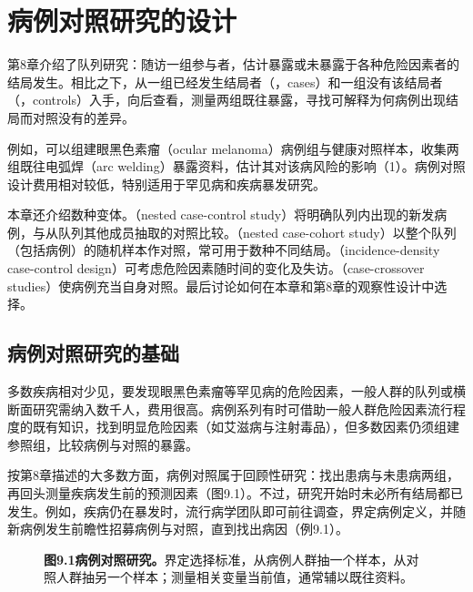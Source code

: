 \chapter{病例对照研究的设计}
\begingroup\setlength{\tabcolsep}{5pt}
第8章介绍了队列研究：随访一组参与者，估计暴露或未暴露于各种危险因素者的结局发生。相比之下，从一组已经发生结局者（，cases）和一组没有该结局者（，controls）入手，向后查看，测量两组既往暴露，寻找可解释为何病例出现结局而对照没有的差异。

例如，可以组建眼黑色素瘤（ocular melanoma）病例组与健康对照样本，收集两组既往电弧焊（arc welding）暴露资料，估计其对该病风险的影响（1）。病例对照设计费用相对较低，特别适用于罕见病和疾病暴发研究。

本章还介绍数种变体。（nested case-control study）将明确队列内出现的新发病例，与从队列其他成员抽取的对照比较。（nested case-cohort study）以整个队列（包括病例）的随机样本作对照，常可用于数种不同结局。（incidence-density case-control design）可考虑危险因素随时间的变化及失访。（case-crossover studies）使病例充当自身对照。最后讨论如何在本章和第8章的观察性设计中选择。

\section{病例对照研究的基础}
多数疾病相对少见，要发现眼黑色素瘤等罕见病的危险因素，一般人群的队列或横断面研究需纳入数千人，费用很高。病例系列有时可借助一般人群危险因素流行程度的既有知识，找到明显危险因素（如艾滋病与注射毒品），但多数因素仍须组建参照组，比较病例与对照的暴露。

按第8章描述的大多数方面，病例对照属于回顾性研究：找出患病与未患病两组，再回头测量疾病发生前的预测因素（图9.1）。不过，研究开始时未必所有结局都已发生。例如，疾病仍在暴发时，流行病学团队即可前往调查，界定病例定义，并随新病例发生前瞻性招募病例与对照，直到找出病因（例9.1）。

\begin{figure}[htbp]\centering\chNineCaseControl
\caption*{\textbf{图9.1\quad 病例对照研究。}界定选择标准，从病例人群抽一个样本，从对照人群抽另一个样本；测量相关变量当前值，通常辅以既往资料。}
\end{figure}

